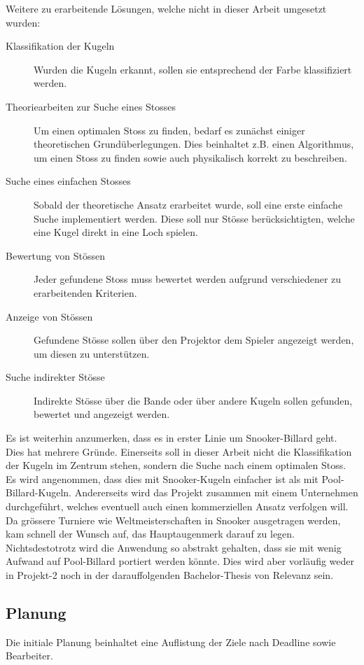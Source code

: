Weitere zu erarbeitende Lösungen, welche nicht in dieser Arbeit umgesetzt wurden:
\begin{description}
    \item[Klassifikation der Kugeln] Wurden die Kugeln erkannt, sollen sie entsprechend der Farbe klassifiziert werden.
    \item[Theoriearbeiten zur Suche eines Stosses] Um einen optimalen Stoss zu finden, bedarf es zunächst einiger
    theoretischen Grundüberlegungen. Dies beinhaltet z.B. einen Algorithmus, um einen Stoss zu finden sowie auch
    physikalisch korrekt zu beschreiben.
    \item[Suche eines einfachen Stosses] Sobald der theoretische Ansatz erarbeitet wurde, soll eine erste einfache
    Suche implementiert werden. Diese soll nur Stösse berücksichtigten, welche eine Kugel direkt in eine Loch spielen.
    \item[Bewertung von Stössen] Jeder gefundene Stoss muss bewertet werden aufgrund verschiedener zu erarbeitenden Kriterien.
    \item[Anzeige von Stössen] Gefundene Stösse sollen über den Projektor dem Spieler angezeigt werden, um diesen
    zu unterstützen.
    \item[Suche indirekter Stösse] Indirekte Stösse über die Bande oder über andere Kugeln sollen gefunden, bewertet und angezeigt werden.
\end{description}

Es ist weiterhin anzumerken, dass es in erster Linie um Snooker-Billard geht. Dies hat mehrere Gründe. Einerseits soll
in dieser Arbeit nicht die Klassifikation der Kugeln im Zentrum stehen, sondern die Suche nach einem optimalen Stoss.
Es wird angenommen, dass dies mit Snooker-Kugeln einfacher ist als mit Pool-Billard-Kugeln. Andererseits wird das
Projekt zusammen mit einem Unternehmen durchgeführt, welches eventuell auch einen kommerziellen Ansatz verfolgen
will. Da grössere Turniere wie Weltmeisterschaften in Snooker ausgetragen werden, kam schnell der Wunsch auf, das
Hauptaugenmerk darauf zu legen. Nichtsdestotrotz wird die Anwendung so abstrakt gehalten, dass sie mit wenig Aufwand
auf Pool-Billard portiert werden könnte. Dies wird aber vorläufig weder in Projekt-2 noch in der darauffolgenden
Bachelor-Thesis von Relevanz sein.

\subsection{Planung}
Die initiale Planung beinhaltet eine Auflistung der Ziele nach Deadline sowie Bearbeiter.

